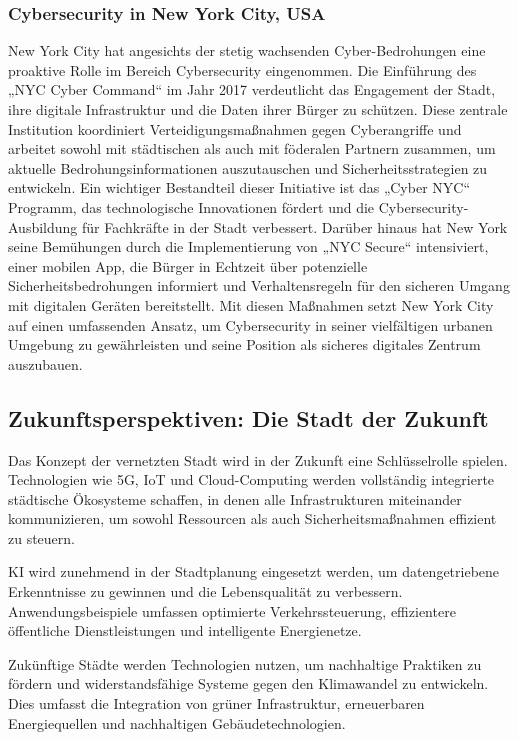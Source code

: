 \documentclass[conference,compsoc,final,a4paper, onecolumn, 11pt]{IEEEtran}
\begin{document}
\subsubsection{Cybersecurity in New York City, USA}
New York City hat angesichts der stetig wachsenden Cyber-Bedrohungen eine proaktive Rolle im Bereich Cybersecurity eingenommen. 
Die Einführung des „NYC Cyber Command“ im Jahr 2017 verdeutlicht das Engagement der Stadt, ihre digitale Infrastruktur und die Daten ihrer Bürger zu schützen. 
Diese zentrale Institution koordiniert Verteidigungsmaßnahmen gegen Cyberangriffe und arbeitet sowohl mit städtischen als auch mit föderalen Partnern zusammen, um aktuelle Bedrohungsinformationen auszutauschen und Sicherheitsstrategien zu entwickeln. \autocite{noauthor_cybersecurity_nodate} 
Ein wichtiger Bestandteil dieser Initiative ist das „Cyber NYC“ Programm, das technologische Innovationen fördert und die Cybersecurity-Ausbildung für Fachkräfte in der Stadt verbessert. \autocite{noauthor_cybersecurity_nodate} 
Darüber hinaus hat New York seine Bemühungen durch die Implementierung von „NYC Secure“ intensiviert, einer mobilen App, die Bürger in Echtzeit über potenzielle Sicherheitsbedrohungen informiert und Verhaltensregeln für den sicheren Umgang mit digitalen Geräten bereitstellt. \autocite{noauthor_nyc_nodate} 
Mit diesen Maßnahmen setzt New York City auf einen umfassenden Ansatz, um Cybersecurity in seiner vielfältigen urbanen Umgebung zu gewährleisten und seine Position als sicheres digitales Zentrum auszubauen.


\subsection{Zukunftsperspektiven: Die Stadt der Zukunft}
Das Konzept der vernetzten Stadt wird in der Zukunft eine Schlüsselrolle spielen. 
Technologien wie 5G, \ac{IoT} und Cloud-Computing werden vollständig integrierte städtische Ökosysteme schaffen, in denen alle Infrastrukturen miteinander kommunizieren, um sowohl Ressourcen als auch Sicherheitsmaßnahmen effizient zu steuern.

\ac{KI} wird zunehmend in der Stadtplanung eingesetzt werden, um datengetriebene Erkenntnisse zu gewinnen und die Lebensqualität zu verbessern. 
Anwendungsbeispiele umfassen optimierte Verkehrssteuerung, effizientere öffentliche Dienstleistungen und intelligente Energienetze.

Zukünftige Städte werden Technologien nutzen, um nachhaltige Praktiken zu fördern und widerstandsfähige Systeme gegen den Klimawandel zu entwickeln. 
Dies umfasst die Integration von grüner Infrastruktur, erneuerbaren Energiequellen und nachhaltigen Gebäudetechnologien.
\end{document}
